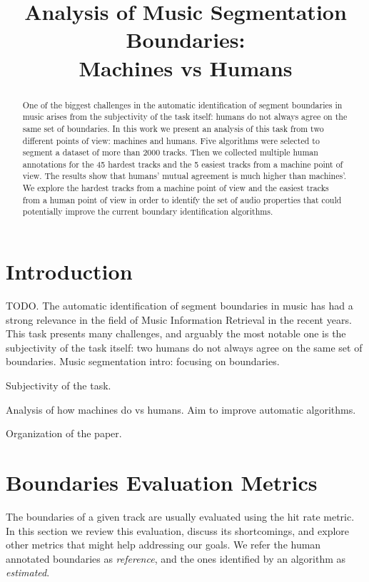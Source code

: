 \documentclass{article}
\title{Analysis of Music Segmentation Boundaries:\\ Machines vs Humans}
\begin{document}
%
\maketitle
%
\begin{abstract}
  One of the biggest challenges in the automatic identification of segment boundaries in music arises from the subjectivity of the task itself: humans do not always agree on the same set of boundaries.
  In this work we present an analysis of this task from two different points of view: machines and humans.
  Five algorithms were selected to segment a dataset of more than 2000 tracks.
  Then we collected multiple human annotations for the 45 hardest tracks and the 5 easiest tracks from a machine point of view.
  The results show that humans' mutual agreement is much higher than machines'.
  We explore the hardest tracks from a machine point of view and the easiest tracks from a human point of view in order to identify the set of audio properties that could potentially improve the current boundary identification algorithms.
  
\end{abstract}
%
\section{Introduction}\label{sec:introduction}

TODO.
The automatic identification of segment boundaries in music has had a strong relevance in the field of Music Information Retrieval in the recent years.
This task presents many challenges, and arguably the most notable one is the subjectivity of the task itself: two humans do not always agree on the same set of boundaries.
Music segmentation intro: focusing on boundaries.

Subjectivity of the task.

Analysis of how machines do vs humans. Aim to improve automatic algorithms.

Organization of the paper.

\section{Boundaries Evaluation Metrics}\label{sec:evalmetrics}

The boundaries of a given track are usually evaluated using the hit rate metric.
In this section we review this evaluation, discuss its shortcomings, and explore other metrics that might help addressing our goals.
We refer the human annotated boundaries as \emph{reference}, and the ones identified by an algorithm as \emph{estimated}.
\end{document}
